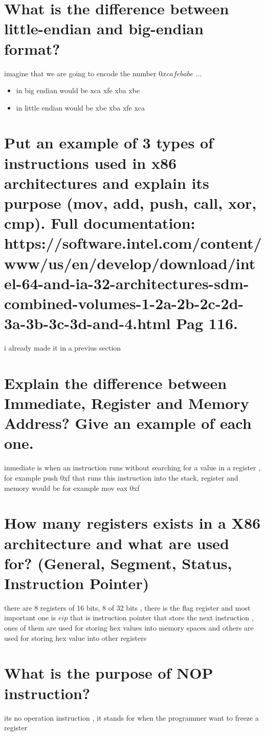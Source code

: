 \documentclass[10pt,a4paper]{article} %
\begin{document}
    \section{What is the difference between little-endian and big-endian format?}
        imagine that we are going to encode the number $ 0xcafebabe  $ ...
        \begin{itemize}
            \item {in big endian would be xca xfe xba xbe}
            \item {in little endian would be  xbe xba xfe xca }
        \end{itemize}

    \section{Put an example of 3 types of instructions used in x86
        architectures and explain its purpose (mov, add, push, call, xor, cmp).
        Full documentation:
        https://software.intel.com/content/www/us/en/develop/download/intel-64-and-ia-32-architectures-sdm-combined-volumes-1-2a-2b-2c-2d-3a-3b-3c-3d-and-4.html
        Pag 116.}
        i already made it in a previus section

    \section{Explain the difference between Immediate, Register and Memory
    Address? Give an example of each one.}
        inmediate is when an instruction runs without searching for a value in
        a register , for example push 0xf that runs this instruction into the
        stack, register and memory would be for example mov eax 0xf

    \section{How many registers exists in a X86 architecture and what are used
    for? (General, Segment, Status, Instruction Pointer)}
        there are 8 registers of 16 bits,  8 of 32 bits , there is the flag
        register and most important one is $ eip  $ that is instruction pointer
        that store the next instruction , ones of them are used for storing hex
        values into memory spaces and others are used for storing hex value
        into other registers

    \section{What is the purpose of NOP instruction?}
        its no operation instruction , it stands for when the programmer want
        to freeze a register
\end{document}
